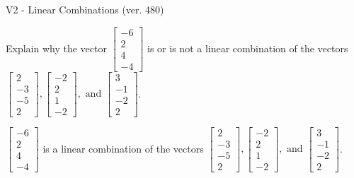 \begin{exercise}
  \begin{exerciseTitle}V2 - Linear Combinations (ver. 480)\end{exerciseTitle}
  \begin{exerciseStatement}
    Explain why the vector \(\left[\begin{array}{c}
-6 \\
2 \\
4 \\
-4
\end{array}\right]\)  is or is not a linear 
	combination of the vectors \(\left[\begin{array}{c}
2 \\
-3 \\
-5 \\
2
\end{array}\right] , \left[\begin{array}{c}
-2 \\
2 \\
1 \\
-2
\end{array}\right] , \text{ and } \left[\begin{array}{c}
3 \\
-1 \\
-2 \\
2
\end{array}\right]\).
	


  \end{exerciseStatement}
  \begin{exerciseAnswer}
   \(\left[\begin{array}{c}
-6 \\
2 \\
4 \\
-4
\end{array}\right]\) 
  	 is  
	a linear combination of the vectors \(\left[\begin{array}{c}
2 \\
-3 \\
-5 \\
2
\end{array}\right] , \left[\begin{array}{c}
-2 \\
2 \\
1 \\
-2
\end{array}\right] , \text{ and } \left[\begin{array}{c}
3 \\
-1 \\
-2 \\
2
\end{array}\right]\).

	
  


  \end{exerciseAnswer}
\end{exercise}